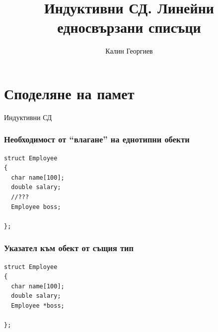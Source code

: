 \documentclass{beamer}
\begin{document}
\title[Обектно ориентирано програмиране]{Индуктивни СД. Линейни едносвързани списъци} 
\author{Калин Георгиев} 
\frame{\titlepage} 

\section{Споделяне на памет} 


\begin{frame}
\centerline{Индуктивни СД}
\end{frame}


\begin{frame}[fragile]
\frametitle{Необходимост от ``влагане'' на еднотипни обекти}
\begin{flushleft}
\begin{lstlisting}
struct Employee
{
  char name[100];
  double salary;
  //???
  Employee boss;

};
\end{lstlisting}  
\end{flushleft}
\end{frame}


\begin{frame}[fragile]
\frametitle{Указател към обект от същия тип}
\begin{flushleft}
\begin{lstlisting}
struct Employee
{
  char name[100];
  double salary;
  Employee *boss;

};
\end{lstlisting}  
\end{flushleft}
\end{frame}
\end{document}
